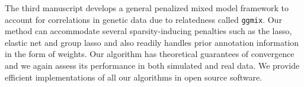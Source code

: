 \documentclass[]{article}
\begin{document}

The third manuscript develops a general penalized mixed model framework to account for correlations in genetic data due to relatedness called \texttt{ggmix}. Our method can accommodate several sparsity-inducing penalties such as the lasso, elastic net and group lasso and also readily handles prior annotation information in the form of weights. Our algorithm has theoretical guarantees of convergence and we again assess its performance in both simulated and real data. We provide efficient implementations of all our algorithms in open source software.




\end{document}
